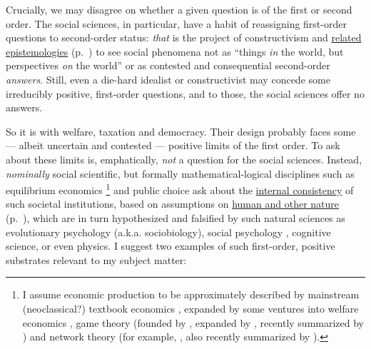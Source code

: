 Crucially, we may disagree on whether a given question is of the first or second order. 
The social sciences, in particular, have a habit of reassigning first-order questions to second-order status: \emph{that} is the project of constructivism \citep[for example,][]{Berger1966} and \hyperref[itm:constructivism]{related epistemologies} (p.~\pageref{itm:constructivism}) to see social phenomena not as ``things \emph{in} the world, but perspectives \emph{on} the world'' \citep[174 on ethnicity, emphasis in the original]{Brubaker-2002-aa} or as contested and consequential second-order \emph{answers}. 
Still, even a die-hard idealist or constructivist may concede some irreducibly positive, first-order questions, and to those, the social sciences offer no answers.

So it is with welfare, taxation and democracy. 
Their design probably faces some --- albeit uncertain and contested --- positive limits of the first order. 
To ask about these limits is, emphatically, \emph{not} a question for the social sciences. 
Instead, \emph{nominally} social scientific, but formally mathematical-logical disciplines such as equilibrium economics
\footnote{
	I assume economic production to be approximately described by mainstream (neoclassical?) textbook economics \citep[including][]{Mankiw-2004-aa,FrankBernanke2004}, expanded by some ventures into welfare economics \citep{Hicks1939,Samuelson-1954-eu},  game theory (founded by \citealt{VonNeumannMorgenstern1944,Nash1951},  expanded by \citealt{Axelrod1981a}, recently summarized by \citealt{Kleinberg-2009-oz}) and network theory (for example, \citealt{Mandelbrot2004}, \citealt{Jackson1968} also recently summarized by \citealt{Kleinberg-2009-oz}).
}
and public choice ask about the \hyperref[itm:internal-consistency]{internal consistency} of such societal institutions, based on assumptions on \hyperref[itm:a-posteriori]{human and other nature} (p.~\pageref{itm:a-posteriori}), which are in turn hypothesized and falsified by such natural sciences as evolutionary psychology (a.k.a. sociobiology), social psychology \citep[initially][]{KahnemanTversky1979}, cognitive science, or even physics. 
I suggest two examples of such first-order, positive substrates relevant to my subject matter:

